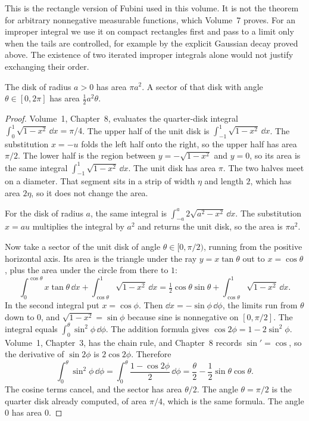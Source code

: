 This is the rectangle version of Fubini used in this volume. It is not the theorem for arbitrary nonnegative measurable functions, which Volume~7 proves. For an improper integral we use it on compact rectangles first and pass to a limit only when the tails are controlled, for example by the explicit Gaussian decay proved above. The existence of two iterated improper integrals alone would not justify exchanging their order.

\begin{lemmax}[sectors]\label{lem:sector}
The disk of radius $a>0$ has area $\pi a^2$. A sector of that disk with angle $\theta\in[0,2\pi]$ has area $\tfrac12 a^2\theta$.
\end{lemmax}
\begin{proof}
Volume~1, Chapter~8, evaluates the quarter-disk integral $\int_0^1\sqrt{1-x^2}\,\dd x=\pi/4$. The upper half of the unit disk is $\int_{-1}^1\sqrt{1-x^2}\,\dd x$. The substitution $x=-u$ folds the left half onto the right, so the upper half has area $\pi/2$. The lower half is the region between $y=-\sqrt{1-x^2}$ and $y=0$, so its area is the same integral $\int_{-1}^1\sqrt{1-x^2}\,\dd x$. The unit disk has area $\pi$. The two halves meet on a diameter. That segment sits in a strip of width $\eta$ and length $2$, which has area $2\eta$, so it does not change the area.

For the disk of radius $a$, the same integral is $\int_{-a}^a 2\sqrt{a^2-x^2}\,\dd x$. The substitution $x=au$ multiplies the integral by $a^2$ and returns the unit disk, so the area is $\pi a^2$.

Now take a sector of the unit disk of angle $\theta\in[0,\pi/2)$, running from the positive horizontal axis. Its area is the triangle under the ray $y=x\tan\theta$ out to $x=\cos\theta$, plus the area under the circle from there to $1$:
\[
 \int_0^{\cos\theta}x\tan\theta\,\dd x+\int_{\cos\theta}^1\sqrt{1-x^2}\,\dd x
 =\tfrac12\cos\theta\sin\theta+\int_{\cos\theta}^1\sqrt{1-x^2}\,\dd x.
\]
In the second integral put $x=\cos\phi$. Then $\dd x=-\sin\phi\,\dd\phi$, the limits run from $\theta$ down to $0$, and $\sqrt{1-x^2}=\sin\phi$ because sine is nonnegative on $[0,\pi/2]$. The integral equals $\int_0^\theta\sin^2\phi\,\dd\phi$. The addition formula gives $\cos 2\phi=1-2\sin^2\phi$. Volume~1, Chapter~3, has the chain rule, and Chapter~8 records $\sin'=\cos$, so the derivative of $\sin 2\phi$ is $2\cos 2\phi$. Therefore
\[
 \int_0^\theta\sin^2\phi\,\dd\phi=\int_0^\theta\frac{1-\cos 2\phi}2\,\dd\phi=\frac\theta2-\frac12\sin\theta\cos\theta.
\]
The cosine terms cancel, and the sector has area $\theta/2$. The angle $\theta=\pi/2$ is the quarter disk already computed, of area $\pi/4$, which is the same formula. The angle $0$ has area $0$.


\end{proof}
